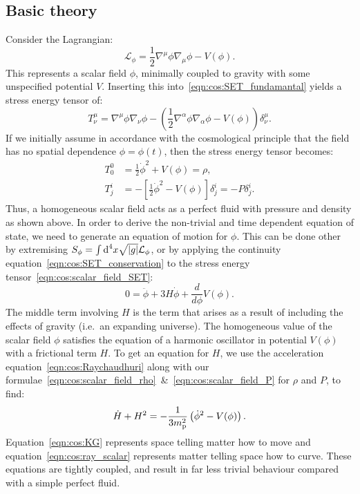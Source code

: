 \subsection{Basic theory}
Consider the Lagrangian:
\begin{equation}
  \mathcal{L}_\phi = \frac{1}{2}\nabla^\mu\phi\nabla_\mu\phi - V(\phi).
  \label{eqn:cos:scalar_field_lagrangian}
\end{equation}
This represents a scalar field $\phi$, minimally coupled to gravity with some unspecified potential $V$.  Inserting this into~\eqref{eqn:cos:SET_fundamantal} yields a stress energy tensor of:
\begin{equation}
  T^{\mu}_{\nu} = \nabla^\mu\phi\nabla_\nu\phi - \left( \frac{1}{2}\nabla^\alpha\phi \nabla_\alpha\phi - V(\phi)  \right)\delta^{\mu}_{\nu}.
  \label{eqn:cos:scalar_field_SET}
\end{equation}
If we initially assume in accordance with the cosmological principle that the field has no spatial dependence $\phi = \phi(t)$, then the stress energy tensor becomes:
\begin{align}
  T^{0}_{0} &=\frac{1}{2}\dot\phi^2 + V(\phi) = \rho,
  \label{eqn:cos:scalar_field_rho}\\
  T^{i}_{j} &=-\left[ \frac{1}{2}\dot\phi^2 - V(\phi)\right]\delta^{i}_{j} = -P\delta^{i}_{j}.
  \label{eqn:cos:scalar_field_P}
\end{align}
Thus, a homogeneous scalar field acts as a perfect fluid with pressure and density as shown above. In order to derive the non-trivial and time dependent equation of state, we need to generate an equation of motion for $\phi$. This can be done other by extremising $S_\phi = \int \d[4]{x} \sqrt{|g|} \mathcal{L}_\phi$, or by applying the continuity equation~\eqref{eqn:cos:SET_conservation} to the stress energy tensor~\eqref{eqn:cos:scalar_field_SET}: 
\begin{equation}
  0 = \ddot{\phi} + 3 H \dot{\phi} + \frac{d}{d\phi}V(\phi).
  \label{eqn:cos:KG}
\end{equation}
The middle term involving $H$ is the term that arises as a result of including the effects of gravity (i.e.\ an expanding universe). The homogeneous value of the scalar field $\phi$ satisfies the equation of a harmonic oscillator in potential $V(\phi)$ with a frictional term $H$.
To get an equation for $H$, we use the acceleration equation~\eqref{eqn:cos:Raychaudhuri} along with our formulae~\eqref{eqn:cos:scalar_field_rho}~\&~\eqref{eqn:cos:scalar_field_P} for $\rho$ and $P$, to find:
\begin{equation}
  \dot{H}+H^2 = -\frac{1}{3\m^2}\left(\dot{\phi}^2-V(\phi)\right).
  \label{eqn:cos:ray_scalar}
\end{equation}
Equation~\eqref{eqn:cos:KG} represents space telling matter how to move and equation~\eqref{eqn:cos:ray_scalar} represents matter telling space how to curve. These equations are tightly coupled, and result in far less trivial behaviour compared with a simple perfect fluid.


